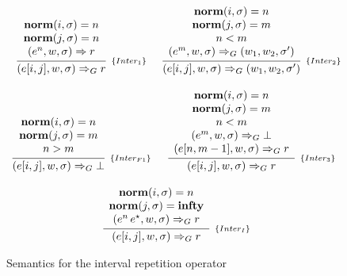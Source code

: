 \documentclass[preprint,12pt]{elsarticle}
\theoremstyle{definition}
\begin{document}
\begin{figure}[h!]
  \[
    \begin{array}{cc}
      \infer[_{\{Inter_{1}\}}]
            {(e[i,j],w,\sigma) \Rightarrow_G r}
            {\begin{array}{c}
               \mathbf{norm}(i,\sigma) = n \\
               \mathbf{norm}(j,\sigma) = n \\
               (e^n,w, \sigma)\Rightarrow r
           \end{array}} &
      \infer[_{\{Inter_2\}}]
            {(e[i,j],w,\sigma)\Rightarrow_G (w_1,w_2,\sigma')}
            {\begin{array}{c}
              \mathbf{norm}(i,\sigma) = n \\
              \mathbf{norm}(j,\sigma) = m \\
              n < m \\
              (e^{m}, w, \sigma)\Rightarrow_G (w_1,w_2,\sigma')
          \end{array}} \\ \\
      \infer[_{\{Inter_{F1}\}}]
            {(e[i,j], w, \sigma) \Rightarrow_G \bot}
            {\begin{array}{c}
                \mathbf{norm}(i,\sigma) = n\\
                \mathbf{norm}(j,\sigma) = m\\
                n > m\\
            \end{array}} &
        \infer[_{\{Inter_3\}}]
              {(e[i,j], w, \sigma) \Rightarrow_G r}
              {\begin{array}{c}
                  \mathbf{norm}(i,\sigma) = n \\
                  \mathbf{norm}(j,\sigma) = m \\
                  n < m \\
                  (e^{m},w,\sigma)\Rightarrow_G \bot  \\
                  (e[n,m - 1],w, \sigma)\Rightarrow_G r
              \end{array}}
        \\ \\
        \multicolumn{2}{c}{
          \infer[_{\{Inter_{I}\}}]
                {(e[i,j], w, \sigma) \Rightarrow_G r}
                {\begin{array}{c}
                    \mathbf{norm}(i,\sigma) = n\\
                    \mathbf{norm}(j,\sigma) = \mathbf{infty} \\
                    (e^n\,e^{\star},w,\sigma)\Rightarrow_G r
                  \end{array}
              }}
    \end{array}
  \]
  \centering
  \caption{Semantics for the interval repetition operator}
  \label{fig:intervalsemantics}
\end{figure}
\end{document}
